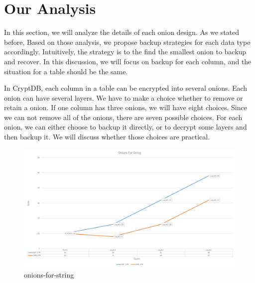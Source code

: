 \section{Our Analysis}

In this section, we will analyze the details of each onion design. As we stated before, Based on those analysis, we propose backup strategies for each data type accordingly. Intuitively, the strategy is to the find the smallest onion to backup and recover. In this discussion, we will focus on backup for each column, and the situation for a table should be the same. 

In CryptDB, each column in a table can be encrypted into several onions. Each onion can have several layers. We have to make a choice whether to remove or retain a onion. If one column has three onions, we will have eight choices. Since we can not remove all of the onions, there are seven possible choices. For each onion, we can either choose to backup it directly, or to decrypt some layers and then backup it. We will discuss whether those choices are practical.

\begin{figure}[tb]
\centering
\includegraphics[width=\columnwidth]{images/onions-for-string.png}
\caption{onions-for-string}
\label{fig:stack4}
\end{figure}


